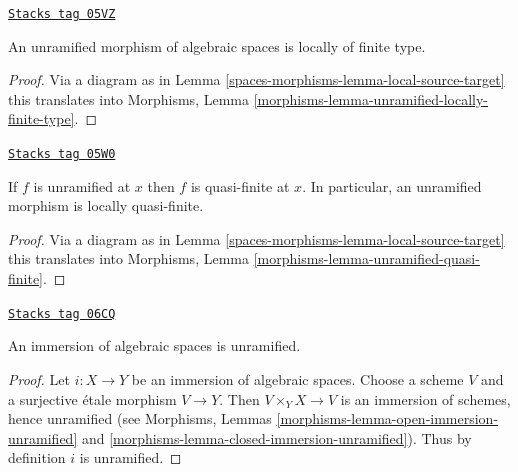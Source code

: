 \begin{lemma}
\label{spaces-morphisms-lemma-unramified-locally-finite-type}
\href{https://stacks.math.columbia.edu/tag/05VZ}{\texttt{Stacks tag 05VZ}}

An unramified morphism of algebraic spaces is locally of finite type.
\end{lemma}

\begin{proof}
Via a diagram as in
Lemma \ref{spaces-morphisms-lemma-local-source-target}
this translates into
Morphisms, Lemma \ref{morphisms-lemma-unramified-locally-finite-type}.
\end{proof}

\begin{lemma}
\label{spaces-morphisms-lemma-unramified-quasi-finite}
\href{https://stacks.math.columbia.edu/tag/05W0}{\texttt{Stacks tag 05W0}}

If $f$ is unramified at $x$ then $f$ is quasi-finite at $x$.
In particular, an unramified morphism is locally quasi-finite.
\end{lemma}

\begin{proof}
Via a diagram as in
Lemma \ref{spaces-morphisms-lemma-local-source-target}
this translates into
Morphisms, Lemma \ref{morphisms-lemma-unramified-quasi-finite}.
\end{proof}

\begin{lemma}
\label{spaces-morphisms-lemma-immersion-unramified}
\href{https://stacks.math.columbia.edu/tag/06CQ}{\texttt{Stacks tag 06CQ}}

An immersion of algebraic spaces is unramified.
\end{lemma}

\begin{proof}
Let $i : X \to Y$ be an immersion of algebraic spaces. Choose a scheme
$V$ and a surjective \'etale morphism $V \to Y$. Then $V \times_Y X \to V$
is an immersion of schemes, hence unramified (see
Morphisms, Lemmas \ref{morphisms-lemma-open-immersion-unramified} and
\ref{morphisms-lemma-closed-immersion-unramified}).
Thus by definition $i$ is unramified.
\end{proof}

